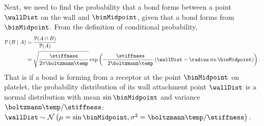 Next, we need to find the probability that a bond forms between a
point $\wallDist$ on the wall and $\binMidpoint$, given that a bond forms from
$\binMidpoint$. From the definition of conditional probability,
\begin{align}
  \mathbb{P} \left( B \mid A \right) 
  &= \frac{\mathbb{P}(A \cap B)}
  {\mathbb{P}(A)} \nonumber \\
  \label{eq:wall-distr}
  &= \sqrt{\frac{\stiffness}{2\pi \boltzmann\temp}} \exp
    \left(-\frac{\stiffness}{2 \boltzmann \temp} \left(\wallDist -
    \radius \sin{\binMidpoint} \right) \right).
\end{align}
That is if a bond is forming from a receptor at the point
$\binMidpoint$ on platelet, the probability distribution of its wall
attachment point $\wallDist$ is a normal distribution with mean
$\sin\binMidpoint$ and variance $\boltzmann\temp/\stiffness$:
$\wallDist \sim \mathcal{N} \left(\mu=\sin\binMidpoint,
  \sigma^2 = \boltzmann\temp/\stiffness \right)$.

